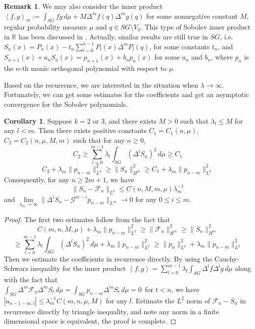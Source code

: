 \documentclass[12pt]{amsart}
\theoremstyle{plain}
\theoremstyle{definition}
\newtheorem{corollary}{Corollary}[section]
\newtheorem{remark}{Remark}[section]
\newcommand{\inner}[2]{\left \langle #1, #2\right \rangle}
\newcommand{\lap}{\Delta}
\begin{document}
\begin{remark}We may also consider the inner product $\inner fg_m:= \int _{SG}fg\,d\mu +M\lap^{m}f(q)\lap^{m}g(q)$ for
some nonnegative constant $M$, regular probability measure $\mu$ and $q \in SG\setminus V_0$. This type of
Sobolev inner product in $\mathbb{R}$ has been discussed in \cite{MX}. Actually, similar results are
still true in $SG$, i.e. $S_n(x)=P_n(x)-t_n\sum\limits_{l=0}^{n-1}P_l(x)\lap^mP_l(q)$, for some constants
$t_n$, and $S_{n+1}(x)+a_nS_n(x)=p_{n+1}(x)+b_np_n(x)$ for some $a_n$ and $b_n$, where $p_n$ is the $n$-th
monic orthogonal polynomial with respect to $\mu$.\\
\end{remark}
Based on the recurrence, we are interested in the situation when $\lambda\rightarrow\infty$. Fortunately, we can get some estimates for the coefficients and get an asymptotic convergence for the Sobolev polynomials.
\begin{corollary} \label{cor:k=2,3 bounds}Suppose $k=2$ or $3$, and there exists $M>0$ such that $\lambda_l\le M$ for any $l<m$. Then there exists positive constants $C_1=C_1(n,\mu)$, $C_2=C_2(n,\mu,M,m)$ such that for any $n\ge 0$, $$C_2 \ge\sum\limits_{l = 0}^{m-1} \lambda_l\int_{SG}(\lap ^l S_n)^2\,d\mu\ge C_1$$ $$
   C_2+\lambda_m\|p_{n-m}\|_{L^2}^2\ge \|S_n\|_{H^m}^2\ge C_1+
   \lambda_m \|p_{n-m}\|_{L^2}^2$$
   Consequently, for any $n\ge 2m+1$, we have$$\|S_n-\mathcal{F}_n\|_{L^2}\le
   C(n,M,m,\mu)\lambda_m^{-1}$$and
   $\lim\limits_{\lambda_m\rightarrow\infty}\|\lap^i S_n-\mathcal{G}^{m-i}p_{n-m}\|_{L^\infty}\rightarrow 0$ for any $0\le i\le m$.
   \begin{proof}
   The first two estimates follow from the fact that 
   $$C(m,n,M,\mu)+\lambda_m\|p_{n-m}\|_{L^2}^2\ge\|\mathcal{F}_n\|_{H^m}^2\ge\|S_n\|_{H^m}^2$$
   $$\ge \sum\limits_{l = 0}^{m-1} \lambda_l\int_{SG}(\lap ^l S_n)^2\,d\mu+\lambda_m\|p_{n-m}\|_{L^2}^2\ge\|p_n\|_{L^2}^2+\lambda_m\|p_{n-m}\|_{L^2}^2$$
   Then we estimate the coefficients in recurrence directly. By using the Cauchy-Schwarz inequality for the inner product $\inner{f}{g} = \sum\limits_{l = 0}^{m-1} \lambda_l\int_{SG}\lap^lf\lap^lg\,d\mu$ along with the fact that \\$\int_{SG}\lap^m \mathcal{F}_n\lap^m S_t\,d\mu=\int_{SG}p_{n-m}\lap^m S_t\,d\mu=0$ \,for $t<n$, we have $|a_{n-1-m,l}|\le \lambda_m^{-1}C(m,n,\mu,M)$ for any $l$. Estimate the $L^2$ norm of $\mathcal{F}_n-S_n$ in recurrence directly by triangle inequality, and note any norm in a finite dimensional space is equivalent, the proof is complete.
   \end{proof}
   \end{corollary}
\end{document}
